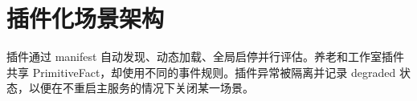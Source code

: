 \section{插件化场景架构}

插件通过 manifest 自动发现、动态加载、全局启停并行评估。养老和工作室插件共享 PrimitiveFact，却使用不同的事件规则。插件异常被隔离并记录 degraded 状态，以便在不重启主服务的情况下关闭某一场景。
